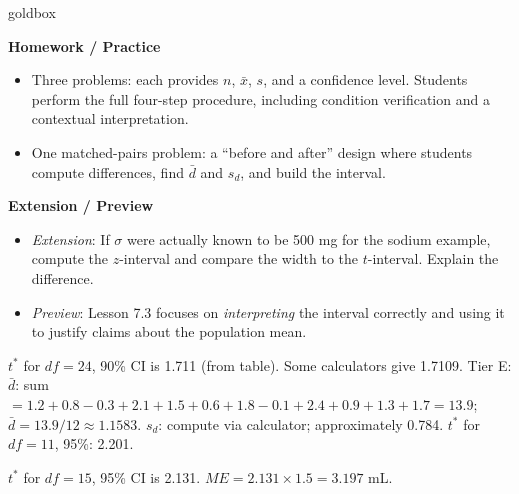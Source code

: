 \documentclass[10pt]{article}
\begin{document}
\begin{skillbox}{goldbox}
\begin{minipage}[t]{0.48\linewidth}
    \textbf{Homework / Practice}
    \begin{itemize}
        \item Three problems: each provides $n$, $\bar x$, $s$, and a confidence
              level. Students perform the full four-step procedure, including condition
              verification and a contextual interpretation.
        \item One matched-pairs problem: a ``before and after'' design where students
              compute differences, find $\bar d$ and $s_d$, and build the interval.
    \end{itemize}
\end{minipage}
\hfill
\begin{minipage}[t]{0.48\linewidth}
    \textbf{Extension / Preview}
    \begin{itemize}
        \item \textit{Extension}: If $\sigma$ were actually known to be 500 mg for
              the sodium example, compute the $z$-interval and compare the width to
              the $t$-interval. Explain the difference.
        \item \textit{Preview}: Lesson 7.3 focuses on \emph{interpreting} the interval
              correctly and using it to justify claims about the population mean.
    \end{itemize}
\end{minipage}
\end{skillbox}


\begin{teachernote}
    $t^*$ for $df = 24$, 90\% CI is 1.711 (from table). Some calculators give 1.7109.
    Tier E: $\bar d$: sum $= 1.2+0.8-0.3+2.1+1.5+0.6+1.8-0.1+2.4+0.9+1.3+1.7 = 13.9$;
    $\bar d = 13.9/12 \approx 1.1583$.
    $s_d$: compute via calculator; approximately 0.784.
    $t^*$ for $df = 11$, 95\%: 2.201.
\end{teachernote}

\begin{teachernote}
    $t^*$ for $df = 15$, 95\% CI is 2.131.
    $ME = 2.131 \times 1.5 = 3.197$ mL.
\end{teachernote}
\end{document}
